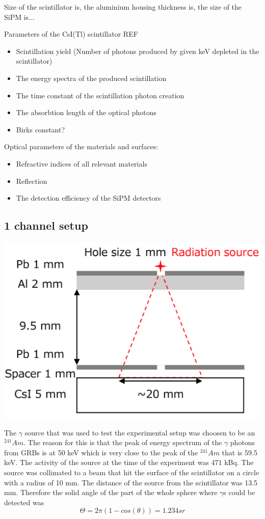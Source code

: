 \documentclass[12pt, a4paper,titlepage]{article}
\numberwithin{equation}{section}
\numberwithin{figure}{section}
\begin{document}
Size of the scintillator is, the aluminium housing thickness is, the size of the SiPM is...

Parameters of the CsI(Tl) scintillator REF

\begin{itemize}
\item Scintillation yield (Number of photons produced by given keV depleted in the scintillator)
\item The energy spectra of the produced scintillation
\item The time constant of the scintillation photon creation
\item The absorbtion length of the optical photons
\item Birks constant?
\end{itemize}

Optical parameters of the materials and surfaces:
\begin{itemize}
\item Refractive indices of all relevant materials
\item Reflection
\item The detection efficiency of the SiPM detectors
\end{itemize}

\subsection{1 channel setup}

\includegraphics[width=150.0mm]{images/irradiation.png}

The $\gamma$ source that was used to test the experimental setup was choosen to be an $^{241}Am$. The reason for this is that the peak of energy spectrum of the $\gamma$ photons from GRBs is at 50 keV which is very close to the peak of the $^{241}Am$ that is 59.5 keV. The activity of the source at the time of the experiment was 471 kBq. The source was collimated to a beam that hit the surface of the scintillator on a circle with a radius of 10 mm. The distance of the source from the scintillator was 13.5 mm. Therefore the solid angle of the part of the whole sphere where $\gamma$s could be detected was 
$$\Theta = 2 \pi (1-cos(\theta)) = 1.234 sr$$
\end{document}
